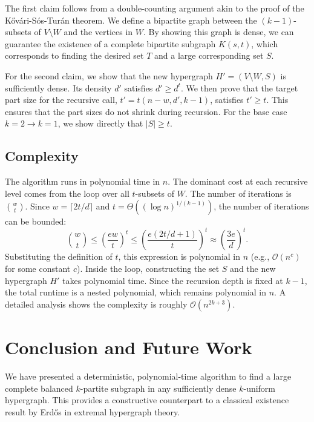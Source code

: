 \documentclass[11pt,a4paper]{article}
\newcommand{\bigO}[1]{\ensuremath{\mathcal{O}(#1)}}
\theoremstyle{definition}
\begin{document}
The first claim follows from a double-counting argument akin to the proof of the Kővári-Sós-Turán theorem. We define a bipartite graph between the $(k-1)$-subsets of $V \setminus W$ and the vertices in $W$. By showing this graph is dense, we can guarantee the existence of a complete bipartite subgraph $K(s,t)$, which corresponds to finding the desired set $T$ and a large corresponding set $S$.

For the second claim, we show that the new hypergraph $H'=(V \setminus W, S)$ is sufficiently dense. Its density $d'$ satisfies $d' \ge d^t$. We then prove that the target part size for the recursive call, $t' = t(n-w, d', k-1)$, satisfies $t' \ge t$. This ensures that the part sizes do not shrink during recursion. For the base case $k=2 \to k=1$, we show directly that $|S| \ge t$.

\subsection{Complexity}

The algorithm runs in polynomial time in $n$. The dominant cost at each recursive level comes from the loop over all $t$-subsets of $W$. The number of iterations is $\binom{w}{t}$. Since $w = \lceil 2t/d \rceil$ and $t = \Theta((\log n)^{1/(k-1)})$, the number of iterations can be bounded:
\[
    \binom{w}{t} \le \left(\frac{ew}{t}\right)^t \le \left(\frac{e(2t/d + 1)}{t}\right)^t \approx \left(\frac{3e}{d}\right)^t.
\]
Substituting the definition of $t$, this expression is polynomial in $n$ (e.g., $\bigO{n^c}$ for some constant $c$). Inside the loop, constructing the set $S$ and the new hypergraph $H'$ takes polynomial time. Since the recursion depth is fixed at $k-1$, the total runtime is a nested polynomial, which remains polynomial in $n$. A detailed analysis shows the complexity is roughly $\bigO{n^{2k+3}}$.

\section{Conclusion and Future Work}

We have presented a deterministic, polynomial-time algorithm to find a large complete balanced $k$-partite subgraph in any sufficiently dense $k$-uniform hypergraph. This provides a constructive counterpart to a classical existence result by Erdős in extremal hypergraph theory.
\end{document}
